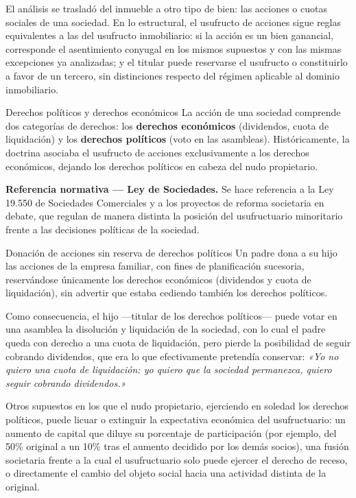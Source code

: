 \documentclass[12pt,oneside]{book}
\begin{document}
El análisis se trasladó del inmueble a otro tipo de bien: las acciones o cuotas sociales de una sociedad. En lo estructural, el usufructo de acciones sigue reglas equivalentes a las del usufructo inmobiliario: si la acción es un bien ganancial, corresponde el asentimiento conyugal en los mismos supuestos y con las mismas excepciones ya analizadas; y el titular puede reservarse el usufructo o constituirlo a favor de un tercero, sin distinciones respecto del régimen aplicable al dominio inmobiliario.

\begin{definition}{Derechos políticos y derechos económicos}
La acción de una sociedad comprende dos categorías de derechos: los \textbf{derechos económicos} (dividendos, cuota de liquidación) y los \textbf{derechos políticos} (voto en las asambleas). Históricamente, la doctrina asociaba el usufructo de acciones exclusivamente a los derechos económicos, dejando los derechos políticos en cabeza del nudo propietario.
\end{definition}

\begin{important}
\textbf{Referencia normativa ---  Ley de Sociedades.} Se hace referencia a la Ley 19.550 de Sociedades Comerciales y a los proyectos de reforma societaria en debate, que regulan de manera distinta la posición del usufructuario minoritario frente a las decisiones políticas de la sociedad.
\end{important}

\begin{example}{Donación de acciones sin reserva de derechos políticos}
Un padre dona a su hijo las acciones de la empresa familiar, con fines de planificación sucesoria, reservándose únicamente los derechos económicos (dividendos y cuota de liquidación), sin advertir que estaba cediendo también los derechos políticos.

Como consecuencia, el hijo ---titular de los derechos políticos--- puede votar en una asamblea la disolución y liquidación de la sociedad, con lo cual el padre queda con derecho a una cuota de liquidación, pero pierde la posibilidad de seguir cobrando dividendos, que era lo que efectivamente pretendía conservar: \textit{«Yo no quiero una cuota de liquidación: yo quiero que la sociedad permanezca, quiero seguir cobrando dividendos.»}

Otros supuestos en los que el nudo propietario, ejerciendo en soledad los derechos políticos, puede licuar o extinguir la expectativa económica del usufructuario: un aumento de capital que diluye su porcentaje de participación (por ejemplo, del 50\% original a un 10\% tras el aumento decidido por los demás socios), una fusión societaria frente a la cual el usufructuario solo puede ejercer el derecho de receso, o directamente el cambio del objeto social hacia una actividad distinta de la original.
\end{example}
\end{document}
